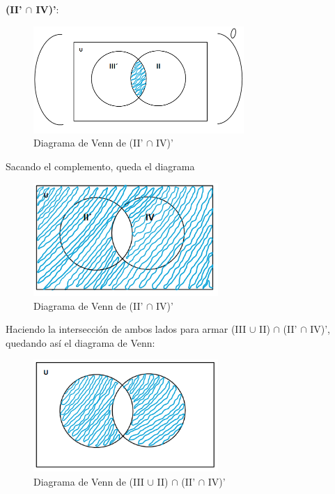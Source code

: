 \newpage

\textbf{(II' $\cap$ IV)'}:

\begin{figure}[htbp]
\centering
\includegraphics[width=8cm]{c/bb.png}
\caption[]{Diagrama de Venn de (II' $\cap$ IV)'}
\end{figure} 

Sacando el complemento, queda el diagrama

\begin{figure}[htbp]
\centering
\includegraphics[width=7cm]{c/bbb.png}
\caption[]{Diagrama de Venn de (II' $\cap$ IV)'}
\end{figure} 

Haciendo la intersección de ambos lados para armar (III $\cup$ II) $\cap$ (II' $\cap$ IV)', quedando así el diagrama de Venn:

\begin{figure}[htbp]
\centering
\includegraphics[width=7cm]{c/aabb.png}
\caption[]{Diagrama de Venn de (III $\cup$ II) $\cap$ (II' $\cap$ IV)'}
\end{figure} 
